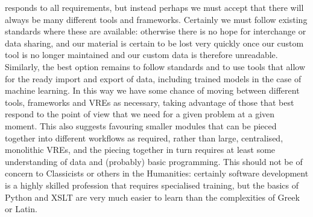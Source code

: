 responds to all requirements, but instead perhaps we must accept that there
will always be many different tools and frameworks. Certainly we must follow
existing standards where these are available: otherwise there is no hope for
interchange or data sharing, and our material is certain to be lost very
quickly once our custom tool is no longer maintained and our custom data is
therefore unreadable. Similarly, the best option remains to follow standards
and to use tools that allow for the ready import and export of data, including
trained models in the case of machine learning. In this way we have some chance
of moving between different tools, frameworks and VREs as necessary, taking
advantage of those that best respond to the point of view that we need for a
given problem at a given moment. This also suggests favouring smaller modules
that can be pieced together into different workflows as required, rather than
large, centralised, monolithic VREs, and the piecing together in turn requires
at least some understanding of data and (probably) basic programming. This
should not be of concern to Classicists or others in the Humanities: certainly
software development is a highly skilled profession that requires specialised
training, but the basics of Python and XSLT are very much easier to learn than
the complexities of Greek or Latin.
